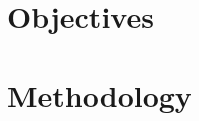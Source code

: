 \documentclass[Ingles]{ic-tese-v3}
\begin{document}
\chapter{Objectives}
\label{sec:orgbfc06a8}

\chapter{Methodology}
\label{sec:org30abdbb}



\end{document}
